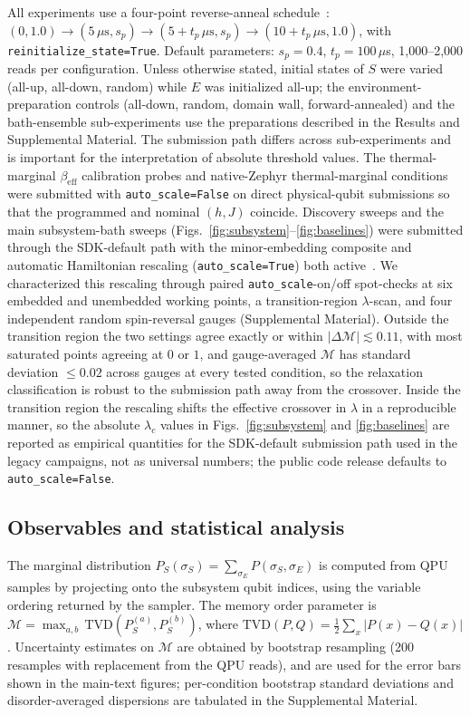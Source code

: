 \documentclass[aps,prapplied,reprint,superscriptaddress,floatfix,nofootinbib]{revtex4-2}
\begin{document}
All experiments use a four-point reverse-anneal schedule~\cite{dwave2024reverse_anneal}: $(0, 1.0) \to (5\,\mu\mathrm{s}, s_p) \to (5+t_p\,\mu\mathrm{s}, s_p) \to (10+t_p\,\mu\mathrm{s}, 1.0)$, with \texttt{reinitialize\_state=True}.
Default parameters: $s_p=0.4$, $t_p=100\,\mu$s, 1{,}000--2{,}000 reads per configuration.
Unless otherwise stated, initial states of $S$ were varied (all-up, all-down, random) while $E$ was initialized all-up; the environment-preparation controls (all-down, random, domain wall, forward-annealed) and the bath-ensemble sub-experiments use the preparations described in the Results and Supplemental Material.
The submission path differs across sub-experiments and is important for the interpretation of absolute threshold values.
The thermal-marginal $\beta_\mathrm{eff}$ calibration probes and native-Zephyr thermal-marginal conditions were submitted with \texttt{auto\_scale=False} on direct physical-qubit submissions so that the programmed and nominal $(h,J)$ coincide.
Discovery sweeps and the main subsystem-bath sweeps (Figs.~\ref{fig:subsystem}--\ref{fig:baselines}) were submitted through the SDK-default path with the minor-embedding composite and automatic Hamiltonian rescaling (\texttt{auto\_scale=True}) both active~\cite{dwave2024system_docs}.
We characterized this rescaling through paired \texttt{auto\_scale}-on/off spot-checks at six embedded and unembedded working points, a transition-region $\lambda$-scan, and four independent random spin-reversal gauges (Supplemental Material).
Outside the transition region the two settings agree exactly or within $|\Delta\mathcal{M}|\lesssim 0.11$, with most saturated points agreeing at $0$ or $1$, and gauge-averaged $\mathcal{M}$ has standard deviation $\le 0.02$ across gauges at every tested condition, so the relaxation classification is robust to the submission path away from the crossover.
Inside the transition region the rescaling shifts the effective crossover in $\lambda$ in a reproducible manner, so the absolute $\lambda_c$ values in Figs.~\ref{fig:subsystem} and \ref{fig:baselines} are reported as empirical quantities for the SDK-default submission path used in the legacy campaigns, not as universal numbers; the public code release defaults to \texttt{auto\_scale=False}.

\subsection{Observables and statistical analysis}

The marginal distribution $P_S(\sigma_S) = \sum_{\sigma_E} P(\sigma_S, \sigma_E)$ is computed from QPU samples by projecting onto the subsystem qubit indices, using the variable ordering returned by the sampler.
The memory order parameter is $\mathcal{M} = \max_{a,b}\,\mathrm{TVD}(P_S^{(a)}, P_S^{(b)})$, where $\mathrm{TVD}(P,Q) = \frac{1}{2}\sum_x |P(x)-Q(x)|$.
Uncertainty estimates on $\mathcal{M}$ are obtained by bootstrap resampling (200 resamples with replacement from the QPU reads), and are used for the error bars shown in the main-text figures; per-condition bootstrap standard deviations and disorder-averaged dispersions are tabulated in the Supplemental Material.
\end{document}
